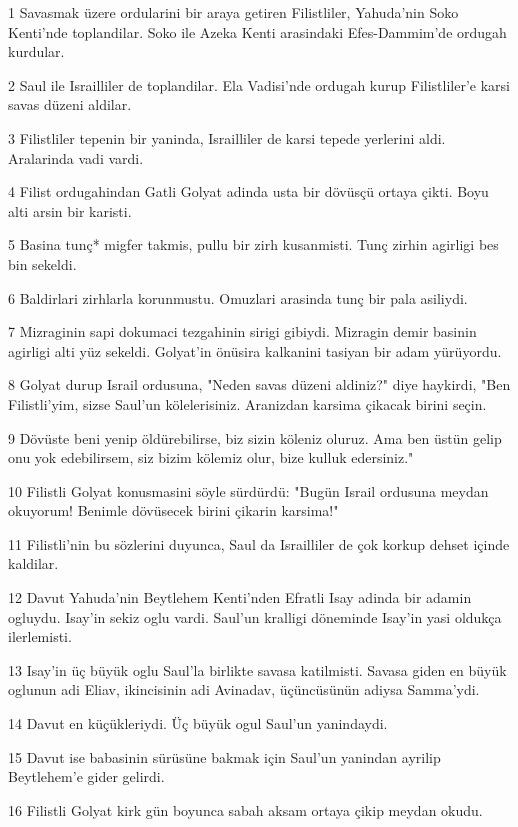 \par 1 Savasmak üzere ordularini bir araya getiren Filistliler, Yahuda'nin Soko Kenti'nde toplandilar. Soko ile Azeka Kenti arasindaki Efes-Dammim'de ordugah kurdular.
\par 2 Saul ile Israilliler de toplandilar. Ela Vadisi'nde ordugah kurup Filistliler'e karsi savas düzeni aldilar.
\par 3 Filistliler tepenin bir yaninda, Israilliler de karsi tepede yerlerini aldi. Aralarinda vadi vardi.
\par 4 Filist ordugahindan Gatli Golyat adinda usta bir dövüsçü ortaya çikti. Boyu alti arsin bir karisti.
\par 5 Basina tunç* migfer takmis, pullu bir zirh kusanmisti. Tunç zirhin agirligi bes bin sekeldi.
\par 6 Baldirlari zirhlarla korunmustu. Omuzlari arasinda tunç bir pala asiliydi.
\par 7 Mizraginin sapi dokumaci tezgahinin sirigi gibiydi. Mizragin demir basinin agirligi alti yüz sekeldi. Golyat'in önüsira kalkanini tasiyan bir adam yürüyordu.
\par 8 Golyat durup Israil ordusuna, "Neden savas düzeni aldiniz?" diye haykirdi, "Ben Filistli'yim, sizse Saul'un kölelerisiniz. Aranizdan karsima çikacak birini seçin.
\par 9 Dövüste beni yenip öldürebilirse, biz sizin köleniz oluruz. Ama ben üstün gelip onu yok edebilirsem, siz bizim kölemiz olur, bize kulluk edersiniz."
\par 10 Filistli Golyat konusmasini söyle sürdürdü: "Bugün Israil ordusuna meydan okuyorum! Benimle dövüsecek birini çikarin karsima!"
\par 11 Filistli'nin bu sözlerini duyunca, Saul da Israilliler de çok korkup dehset içinde kaldilar.
\par 12 Davut Yahuda'nin Beytlehem Kenti'nden Efratli Isay adinda bir adamin ogluydu. Isay'in sekiz oglu vardi. Saul'un kralligi döneminde Isay'in yasi oldukça ilerlemisti.
\par 13 Isay'in üç büyük oglu Saul'la birlikte savasa katilmisti. Savasa giden en büyük oglunun adi Eliav, ikincisinin adi Avinadav, üçüncüsünün adiysa Samma'ydi.
\par 14 Davut en küçükleriydi. Üç büyük ogul Saul'un yanindaydi.
\par 15 Davut ise babasinin sürüsüne bakmak için Saul'un yanindan ayrilip Beytlehem'e gider gelirdi.
\par 16 Filistli Golyat kirk gün boyunca sabah aksam ortaya çikip meydan okudu.
